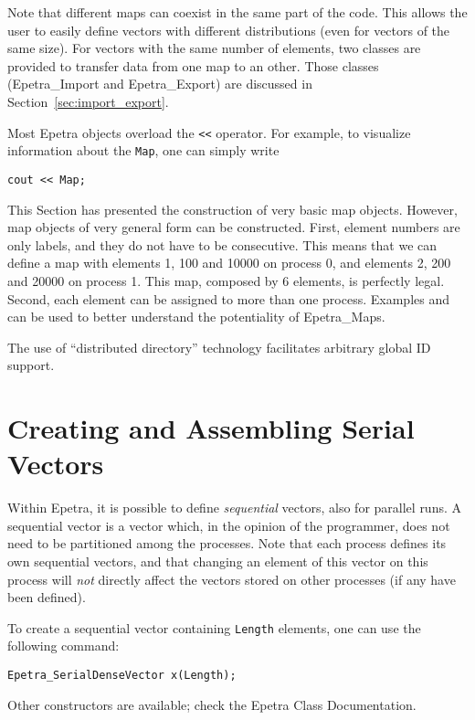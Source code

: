 \smallskip

Note that different maps can coexist in the same part of the code. This
allows the user to easily define vectors with different distributions
(even for vectors of the same size).  For vectors with the same number
of elements, two classes are provided to transfer data from one map to
an other. Those classes (Epetra\_Import and Epetra\_Export) are
discussed in Section~\ref{sec:import_export}.

\begin{remark}
Most Epetra objects overload the \verb!<<! operator. For example, to
visualize information about the \verb!Map!, one can simply write
\begin{verbatim}
cout << Map;
\end{verbatim}
\end{remark}

This Section has presented the construction of very basic map objects.
However, map objects of very general form can be constructed. First,
element numbers are only labels, and they do not have to be consecutive.
This means that we can define a map with elements 1, 100 and 10000 on
process 0, and elements 2, 200 and 20000 on process 1. This map,
composed by 6 elements, is perfectly legal. Second, each element can be
assigned to more than one process. Examples  and
 can be used to better understand the potentiality
of Epetra\_Maps.

\begin{remark}
  The use of ``distributed directory'' technology facilitates arbitrary
  global ID support.
\end{remark}


\section{Creating and Assembling Serial Vectors}
\label{sec:serial_vec}

Within Epetra, it is possible to define {\em sequential} vectors, also
for parallel runs. A sequential vector is a vector which, in the opinion
of the programmer, does not need to be partitioned among the processes.
Note that each process defines its own sequential vectors, and that
changing an element of this vector on this process will {\em not}
directly affect the vectors stored on other processes (if any have been
defined).

To create a sequential vector containing {\tt Length} elements, one can
use the following command:
\begin{verbatim}
Epetra_SerialDenseVector x(Length);
\end{verbatim}
Other constructors are available; check the Epetra Class
Documentation.

